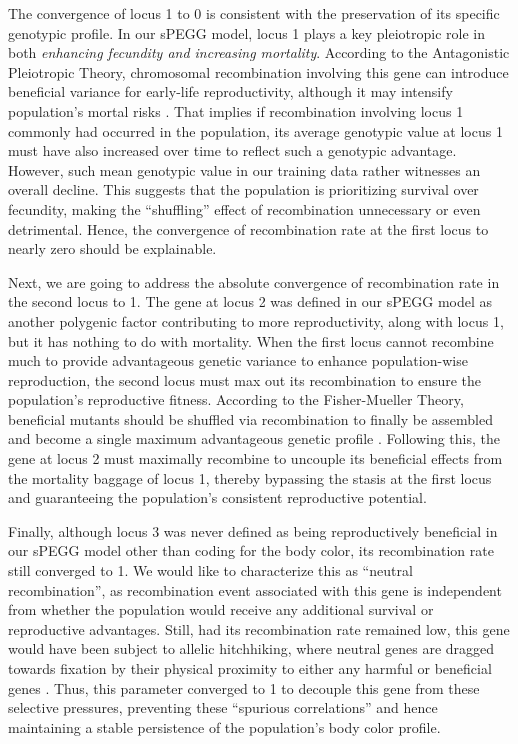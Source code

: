 \documentclass[12pt]{article}
\begin{document}
The convergence of locus 1 to 0 is consistent with the preservation of its specific genotypic profile. In our sPEGG model, locus 1 plays a key pleiotropic role in both \emph{enhancing fecundity and increasing mortality}. According to the Antagonistic Pleiotropic Theory, chromosomal recombination involving this gene can introduce beneficial variance for early-life reproductivity, although it may intensify population's mortal risks \cite{antagonisticcoevolution2018}. That implies if recombination involving locus 1 commonly had occurred in the population, its average genotypic value at locus 1 must have also increased over time to reflect such a genotypic advantage. However, such mean genotypic value in our training data rather witnesses an overall decline. This suggests that the population is prioritizing survival over fecundity, making the \enquote{shuffling} effect of recombination unnecessary or even detrimental. Hence, the convergence of recombination rate at the first locus to nearly zero should be explainable.

Next, we are going to address the absolute convergence of recombination rate in the second locus to 1. The gene at locus 2 was defined in our sPEGG model as another polygenic factor contributing to more reproductivity, along with locus 1, but it has nothing to do with mortality. When the first locus cannot recombine much to provide advantageous genetic variance to enhance population-wise reproduction, the second locus must max out its recombination to ensure the population's reproductive fitness. According to the Fisher-Mueller Theory, beneficial mutants should be shuffled via recombination to finally be assembled and become a single maximum advantageous genetic profile \cite{fishermuller}. Following this, the gene at locus 2 must maximally recombine to uncouple its beneficial effects from the mortality baggage of locus 1, thereby bypassing the stasis at the first locus and guaranteeing the population's consistent reproductive potential.

Finally, although locus 3 was never defined as being reproductively beneficial in our sPEGG model other than coding for the body color, its recombination rate still converged to 1. We would like to characterize this as \enquote{neutral recombination}, as recombination event associated with this gene is independent from whether the population would receive any additional survival or reproductive advantages. Still, had its recombination rate remained low, this gene would have been subject to allelic hitchhiking, where neutral genes are dragged towards fixation by their physical proximity to either any harmful or beneficial genes \cite{hitchhiking}. Thus, this parameter converged to 1 to decouple this gene from these selective pressures, preventing these \enquote{spurious correlations} and hence maintaining a stable persistence of the population's body color profile.
\end{document}
